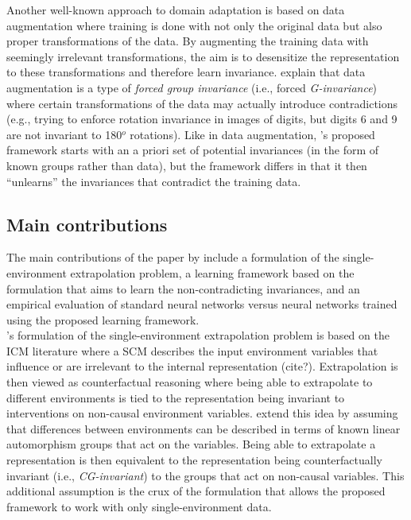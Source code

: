 Another well-known approach to domain adaptation is based on data augmentation \parencite{Chen:2020} where training is done with not only the original data but also proper transformations of the data. By augmenting the training data with seemingly irrelevant transformations, the aim is to desensitize the representation to these transformations and therefore learn invariance. \citeauthor{Mouli:2021} explain that data augmentation is a type of \textit{forced group invariance} (i.e., forced \textit{G-invariance}) where certain transformations of the data may actually introduce contradictions (e.g., trying to enforce rotation invariance in images of digits, but digits 6 and 9 are not invariant to 180$^o$ rotations). Like in data augmentation, \citeauthor{Mouli:2021}'s proposed framework starts with an a priori set of potential invariances (in the form of known groups rather than data), but the framework differs in that it then ``unlearns'' the invariances that contradict the training data.


\subsection{Main contributions}

The main contributions of the paper by \textcite{Mouli:2021} include a formulation of the single-environment extrapolation problem, a learning framework based on the formulation that aims to learn the non-contradicting invariances, and an empirical evaluation of standard neural networks versus neural networks trained using the proposed learning framework.
\\

\citeauthor{Mouli:2021}'s formulation of the single-environment extrapolation problem is based on the ICM literature where a SCM describes the input environment variables that influence or are irrelevant to the internal representation (\todo cite?). Extrapolation is then viewed as counterfactual reasoning where being able to extrapolate to different environments is tied to the representation being invariant to interventions on non-causal environment variables. \citeauthor{Mouli:2021} extend this idea by assuming that differences between environments can be described in terms of known linear automorphism groups that act on the variables. Being able to extrapolate a representation is then equivalent to the representation being counterfactually invariant (i.e., \textit{CG-invariant}) to the groups that act on non-causal variables. This additional assumption is the crux of the formulation that allows the proposed framework to work with only single-environment data.
\\


